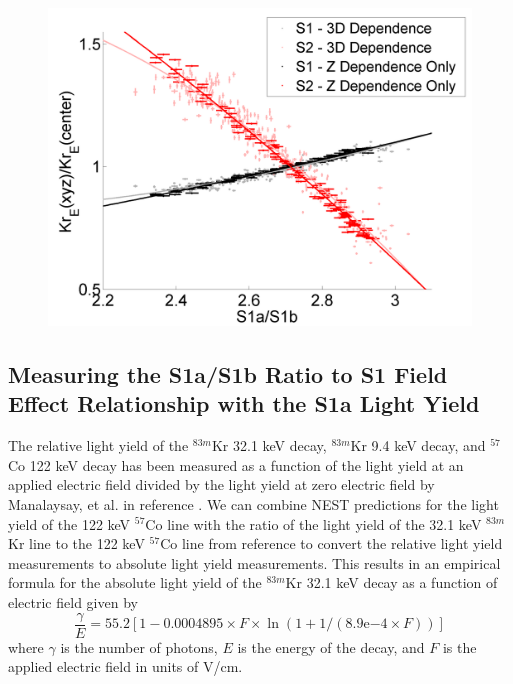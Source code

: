 \begin{figure}
\includegraphics[scale=0.4]{Run04Corrections/S1aS1bvField_ZDep_3D.png}
 \label{fig:S1FieldFig}
\end{figure}

\subsection{Measuring the S1a/S1b Ratio to S1 Field Effect Relationship with the S1a Light Yield} \label{MatthewsIdea}

The relative light yield of the $^{83m}$Kr 32.1 keV decay, $^{83m}$Kr 9.4 keV decay, and $^{57}$Co 122 keV decay has been measured as a function of the light yield at an applied electric field divided by the light yield at zero electric field by Manalaysay, et al. in reference \cite{Manalaysay}.  We can combine NEST predictions for the light yield of the 122 keV $^{57}$Co line with the ratio of the light yield of the 32.1 keV $^{83m}$Kr line to the 122 keV $^{57}$Co line from reference \cite{Manalaysay} to convert the relative light yield measurements to absolute light yield measurements.  This results in an empirical formula for the absolute light yield of the $^{83m}$Kr 32.1 keV decay as a function of electric field given by
\begin{equation}
\frac{\gamma}{E} = 55.2[1-0.0004895 \times F \times \ln{(1 + 1/(8.9\mathrm{e}{-4} \times F))}]
\label{S1aYield}
\end{equation}
where $\gamma$ is the number of photons, $E$ is the energy of the decay, and $F$ is the applied electric field in units of V/cm.  

